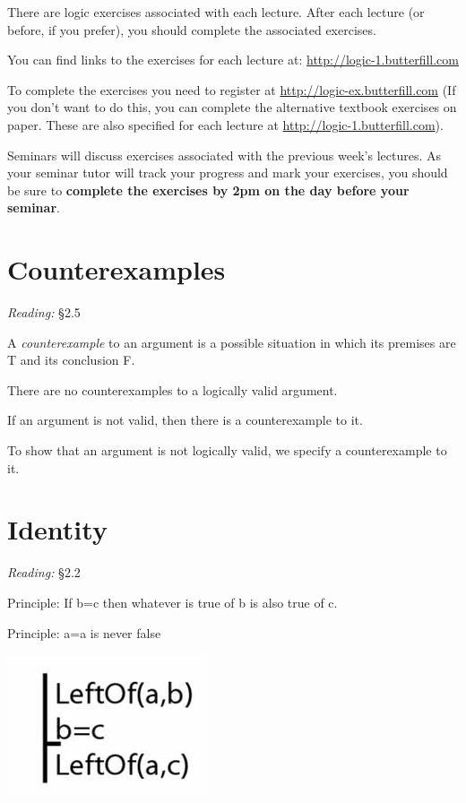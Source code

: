 \documentclass[12pt]{extarticle}
\begin{document}
\begin{multicols*}{3}
There are logic exercises associated with each lecture. After each lecture (or before, if you prefer), you should complete the associated exercises.
 
You can find links to the exercises for each lecture at: \url{http://logic-1.butterfill.com}
 
To complete the exercises you need to register at \url{http://logic-ex.butterfill.com} (If you don’t want to do this, you can complete the alternative textbook exercises on paper. These are also specified for each lecture at \url{http://logic-1.butterfill.com}).
 
Seminars will discuss exercises associated with the previous week’s lectures. As your seminar tutor will track your progress and mark your exercises, you should be sure to \textbf{complete the exercises by 2pm on the day before your seminar}.
 

 
\section{Counterexamples}
 
\emph{Reading:} §2.5
 
A \emph{counterexample} to an argument is a possible situation in which its premises are T and its conclusion F.
 
There are no counterexamples to a logically valid argument.
 
If an argument is not valid, then there is a counterexample to it.
 
To show that an argument is not logically valid, we specify a counterexample to it.
 
 
 
\section{Identity}
 
\emph{Reading:} §2.2
 
Principle: If b=c then whatever is true of b is also true of c.
 
Principle: a=a is never false
 
\begin{center}
\includegraphics[scale=0.3]{img/arg_identity.png}
\end{center}
 

\end{multicols*}
\end{document}
